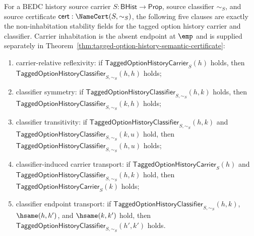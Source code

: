 \begin{theorem}
\label{thm:tagged-option-history-stability-fields}
For a BEDC history source carrier $S:\mathsf{BHist}\to\mathsf{Prop}$, source classifier $\sim_S$, and source certificate $\mathsf{cert}:\NameCert(S,\sim_S)$, the following five clauses are exactly the non-inhabitation stability fields for the tagged option history carrier and classifier. Carrier inhabitation is the absent endpoint at $\emp$ and is supplied separately in Theorem~\ref{thm:tagged-option-history-semantic-certificate}:
\begin{enumerate}
  \item carrier-relative reflexivity: if $\mathsf{TaggedOptionHistoryCarrier}_S(h)$ holds, then $\mathsf{TaggedOptionHistoryClassifier}_{S,\sim_S}(h,h)$ holds;
  \item classifier symmetry: if $\mathsf{TaggedOptionHistoryClassifier}_{S,\sim_S}(h,k)$ holds, then $\mathsf{TaggedOptionHistoryClassifier}_{S,\sim_S}(k,h)$ holds;
  \item classifier transitivity: if $\mathsf{TaggedOptionHistoryClassifier}_{S,\sim_S}(h,k)$ and $\mathsf{TaggedOptionHistoryClassifier}_{S,\sim_S}(k,u)$ hold, then $\mathsf{TaggedOptionHistoryClassifier}_{S,\sim_S}(h,u)$ holds;
  \item classifier-induced carrier transport: if $\mathsf{TaggedOptionHistoryCarrier}_S(h)$ and $\mathsf{TaggedOptionHistoryClassifier}_{S,\sim_S}(h,k)$ hold, then $\mathsf{TaggedOptionHistoryCarrier}_S(k)$ holds;
  \item classifier endpoint transport: if $\mathsf{TaggedOptionHistoryClassifier}_{S,\sim_S}(h,k)$, $\hsame(h,h')$, and $\hsame(k,k')$ hold, then $\mathsf{TaggedOptionHistoryClassifier}_{S,\sim_S}(h',k')$ holds.
\end{enumerate}
\end{theorem}
